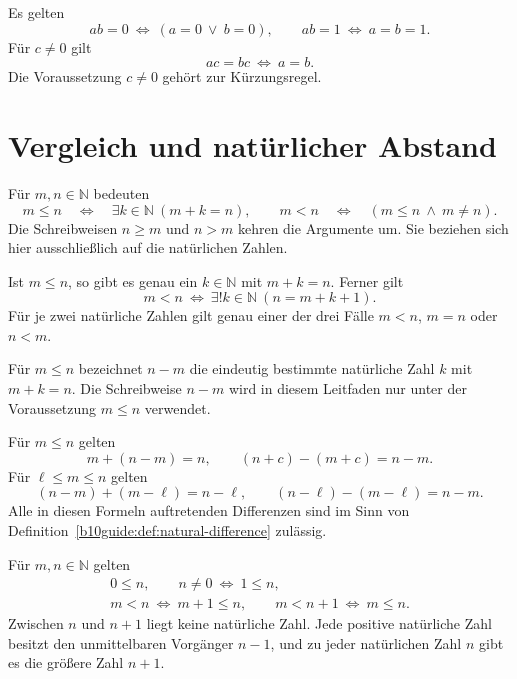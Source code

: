 \begin{theorem}
\label{b10guide:thm:product-cancellation}
Es gelten
\[
 ab=0\ \Longleftrightarrow\ (a=0\ \lor\ b=0),\qquad
 ab=1\ \Longleftrightarrow\ a=b=1.
\]
Für $c\ne0$ gilt
\[
 ac=bc\ \Longleftrightarrow\ a=b.
\]
Die Voraussetzung $c\ne0$ gehört zur Kürzungsregel.
\end{theorem}

\section{Vergleich und natürlicher Abstand}

\begin{definition}
\label{b10guide:def:natural-order}
Für $m,n\in\mathbb N$ bedeuten
\[
 m\le n\quad\Longleftrightarrow\quad
 \exists k\in\mathbb N\ (m+k=n),
 \qquad
 m<n\quad\Longleftrightarrow\quad(m\le n\ \land\ m\ne n).
\]
Die Schreibweisen $n\ge m$ und $n>m$ kehren die Argumente um.
Sie beziehen sich hier ausschließlich auf die natürlichen Zahlen.
\end{definition}

\begin{theorem}
\label{b10guide:thm:natural-distance}
Ist $m\le n$, so gibt es genau ein $k\in\mathbb N$ mit $m+k=n$.
Ferner gilt
\[
 m<n\ \Longleftrightarrow\
 \exists!k\in\mathbb N\ (n=m+k+1).
\]
Für je zwei natürliche Zahlen gilt genau einer der drei Fälle
$m<n$, $m=n$ oder $n<m$.
\end{theorem}

\begin{definition}
\label{b10guide:def:natural-difference}
Für $m\le n$ bezeichnet $n-m$ die eindeutig bestimmte natürliche
Zahl $k$ mit $m+k=n$. Die Schreibweise $n-m$ wird in diesem
Leitfaden nur unter der Voraussetzung $m\le n$ verwendet.
\end{definition}

\begin{theorem}
\label{b10guide:thm:natural-difference}
Für $m\le n$ gelten
\[
 m+(n-m)=n,\qquad (n+c)-(m+c)=n-m.
\]
Für $\ell\le m\le n$ gelten
\[
 (n-m)+(m-\ell)=n-\ell,\qquad
 (n-\ell)-(m-\ell)=n-m.
\]
Alle in diesen Formeln auftretenden Differenzen sind im Sinn
von Definition~\ref{b10guide:def:natural-difference} zulässig.
\end{theorem}

\begin{theorem}
\label{b10guide:thm:discrete-order}
Für $m,n\in\mathbb N$ gelten
\[
 \begin{gathered}
 0\le n,\qquad n\ne0\ \Longleftrightarrow\ 1\le n,\\
 m<n\ \Longleftrightarrow\ m+1\le n,
 \qquad m<n+1\ \Longleftrightarrow\ m\le n.
 \end{gathered}
\]
Zwischen $n$ und $n+1$ liegt keine natürliche Zahl. Jede positive
natürliche Zahl besitzt den unmittelbaren Vorgänger $n-1$, und
zu jeder natürlichen Zahl $n$ gibt es die größere Zahl $n+1$.
\end{theorem}

